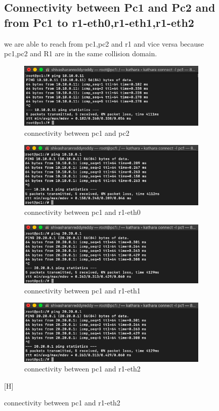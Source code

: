 \begin{figure}[H]
\subsection{Connectivity between Pc1 and Pc2 and from Pc1 to r1-eth0,r1-eth1,r1-eth2}
we are able to reach from pc1,pc2 and r1 and vice versa because pc1,pc2 and R1 are in the same collision domain.
\begin{figure}[H]
\centering
  \includegraphics[width=400pt]{Images/Connectivity between Pc1 and Pc2.png}
  \caption{connectivity between pc1 and pc2}
  \label{fig:2.22}
\end{figure}
\begin{figure}[H]
\centering
  \includegraphics[width=400pt]{Images/Connectivity between Pc1 and R1-eth0.png}
  \caption{connectivity between pc1 and r1-eth0}
  \label{fig:2.23}
\end{figure}
\begin{figure}[H]
\centering
  \includegraphics[width=400pt]{Images/Connectivity between pc1 and r1-eth2.png}
  \caption{connectivity between pc1 and r1-eth1}
  \label{fig:2.25}
\end{figure}
\begin{figure}[H]
\centering
  \includegraphics[width=400pt]{Images/Connectivity between pc1 and r1-eth2.png}
  \caption{connectivity between pc1 and r1-eth2}
  \label{fig:2.26}
\end{figure} [H]

\end{figure}

